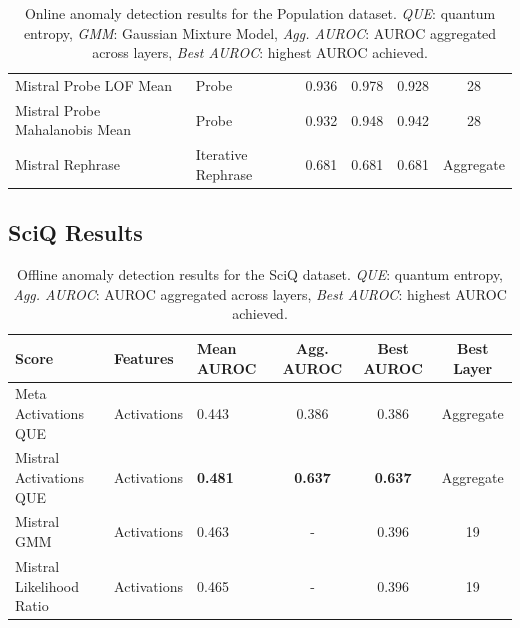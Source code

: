 \begin{table}[H]
\begin{tabular}{lp{3cm}lccc}
Mistral Probe LOF Mean               & Probe      & 0.936  & 0.978  & 0.928  & 28 \\ 
Mistral Probe Mahalanobis Mean       & Probe      & 0.932  & 0.948  & 0.942  & 28 \\ 
Mistral Rephrase                     & Iterative Rephrase & 0.681  & 0.681  & 0.681  & Aggregate \\ 
\bottomrule
\end{tabular}
\caption{ Online anomaly detection results for the Population dataset. \emph{QUE}: quantum entropy, \emph{GMM}: Gaussian Mixture Model, \emph{Agg. AUROC}: AUROC aggregated across layers, \emph{Best AUROC}: highest AUROC achieved.}
\label{tab:online_anomaly_population}
\end{table}

\subsection{SciQ Results}


\begin{table}[H]
\centering
\scriptsize  %
\renewcommand{\arraystretch}{1.2}  %
\setlength{\tabcolsep}{2pt}  %
\begin{tabular}{lp{3cm}lccc}
\toprule
\textbf{Score} & \textbf{Features} & \textbf{Mean AUROC} & \textbf{Agg. AUROC} & \textbf{Best AUROC} & \textbf{Best Layer} \\
\midrule
Meta Activations QUE             & Activations & 0.443  & 0.386  & 0.386  & Aggregate \\ 
Mistral Activations QUE          & Activations & \textbf{0.481}  & \textbf{0.637}  & \textbf{0.637}  & Aggregate \\ 
Mistral GMM & Activations & 0.463  & -      & 0.396  & 19 \\ 
Mistral Likelihood Ratio         & Activations & 0.465  & -      & 0.396  & 19 \\ 
\bottomrule
\end{tabular}
\caption{ Offline anomaly detection results for the SciQ dataset. \emph{QUE}: quantum entropy, \emph{Agg. AUROC}: AUROC aggregated across layers, \emph{Best AUROC}: highest AUROC achieved.}
\label{tab:offline_anomaly_sciq}
\end{table}

